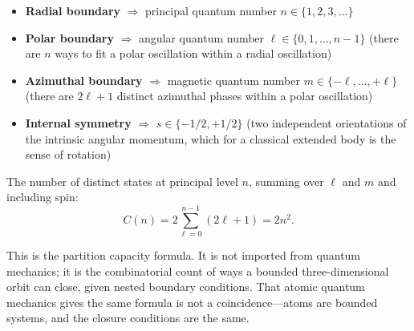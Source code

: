 \documentclass[twocolumn,10pt]{article}
\begin{document}
\begin{itemize}
    \item \textbf{Radial boundary} $\Rightarrow$ principal quantum number $n \in \{1, 2, 3, \ldots\}$
    \item \textbf{Polar boundary} $\Rightarrow$ angular quantum number $\ell \in \{0, 1, \ldots, n-1\}$ (there are $n$ ways to fit a polar oscillation within a radial oscillation)
    \item \textbf{Azimuthal boundary} $\Rightarrow$ magnetic quantum number $m \in \{-\ell, \ldots, +\ell\}$ (there are $2\ell+1$ distinct azimuthal phases within a polar oscillation)
    \item \textbf{Internal symmetry} $\Rightarrow$ $s \in \{-1/2, +1/2\}$ (two independent orientations of the intrinsic angular momentum, which for a classical extended body is the sense of rotation)
\end{itemize}

The number of distinct states at principal level $n$, summing over $\ell$ and $m$ and including spin:
\begin{equation}
    C(n) = 2\sum_{\ell=0}^{n-1}(2\ell+1) = 2n^2.
    \label{eq:capacity}
\end{equation}

This is the partition capacity formula. It is not imported from quantum mechanics; it is the combinatorial count of ways a bounded three-dimensional orbit can close, given nested boundary conditions. That atomic quantum mechanics gives the same formula is not a coincidence---atoms are bounded systems, and the closure conditions are the same.
\end{document}
